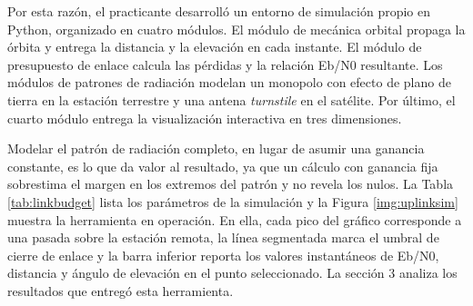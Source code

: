 Por esta razón, el practicante desarrolló un entorno de simulación propio en Python, organizado en cuatro módulos. El módulo de mecánica orbital propaga la órbita y entrega la distancia y la elevación en cada instante. El módulo de presupuesto de enlace calcula las pérdidas y la relación Eb/N0 resultante. Los módulos de patrones de radiación modelan un monopolo con efecto de plano de tierra en la estación terrestre y una antena \textit{turnstile} en el satélite. Por último, el cuarto módulo entrega la visualización interactiva en tres dimensiones.

Modelar el patrón de radiación completo, en lugar de asumir una ganancia constante, es lo que da valor al resultado, ya que un cálculo con ganancia fija sobrestima el margen en los extremos del patrón y no revela los nulos. La Tabla \ref{tab:linkbudget} lista los parámetros de la simulación y la Figura \ref{img:uplinksim} muestra la herramienta en operación. En ella, cada pico del gráfico corresponde a una pasada sobre la estación remota, la línea segmentada marca el umbral de cierre de enlace y la barra inferior reporta los valores instantáneos de Eb/N0, distancia y ángulo de elevación en el punto seleccionado. La sección 3 analiza los resultados que entregó esta herramienta.

